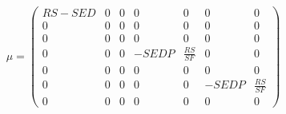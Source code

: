 $$  \mu = 
  \begin{pmatrix}
    RS-SED & 0 & 0 & 0 & 0 & 0 & 0\\
    0 & 0 & 0 & 0 & 0 & 0 & 0\\
    0 & 0 & 0 & 0 & 0 & 0 & 0\\
    0 & 0 & 0 & -SEDP & \frac{RS}{SF} & 0 & 0\\
    0 & 0 & 0 & 0 & 0 & 0 & 0\\
    0 & 0 & 0 & 0 & 0 & -SEDP & \frac{RS}{SF}\\
    0 & 0 & 0 & 0 & 0 & 0 & 0
  \end{pmatrix}
$$  

